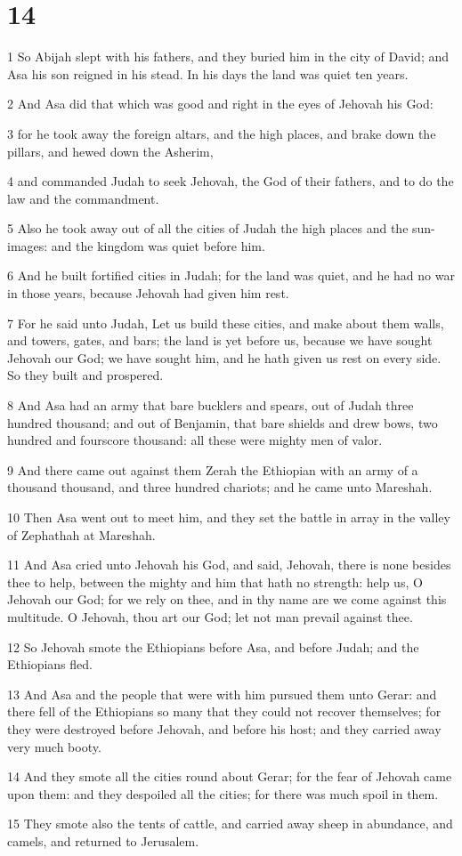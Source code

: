 \chapter{14}

\par 1 So Abijah slept with his fathers, and they buried him in the city of David; and Asa his son reigned in his stead. In his days the land was quiet ten years.
\par 2 And Asa did that which was good and right in the eyes of Jehovah his God:
\par 3 for he took away the foreign altars, and the high places, and brake down the pillars, and hewed down the Asherim,
\par 4 and commanded Judah to seek Jehovah, the God of their fathers, and to do the law and the commandment.
\par 5 Also he took away out of all the cities of Judah the high places and the sun-images: and the kingdom was quiet before him.
\par 6 And he built fortified cities in Judah; for the land was quiet, and he had no war in those years, because Jehovah had given him rest.
\par 7 For he said unto Judah, Let us build these cities, and make about them walls, and towers, gates, and bars; the land is yet before us, because we have sought Jehovah our God; we have sought him, and he hath given us rest on every side. So they built and prospered.
\par 8 And Asa had an army that bare bucklers and spears, out of Judah three hundred thousand; and out of Benjamin, that bare shields and drew bows, two hundred and fourscore thousand: all these were mighty men of valor.
\par 9 And there came out against them Zerah the Ethiopian with an army of a thousand thousand, and three hundred chariots; and he came unto Mareshah.
\par 10 Then Asa went out to meet him, and they set the battle in array in the valley of Zephathah at Mareshah.
\par 11 And Asa cried unto Jehovah his God, and said, Jehovah, there is none besides thee to help, between the mighty and him that hath no strength: help us, O Jehovah our God; for we rely on thee, and in thy name are we come against this multitude. O Jehovah, thou art our God; let not man prevail against thee.
\par 12 So Jehovah smote the Ethiopians before Asa, and before Judah; and the Ethiopians fled.
\par 13 And Asa and the people that were with him pursued them unto Gerar: and there fell of the Ethiopians so many that they could not recover themselves; for they were destroyed before Jehovah, and before his host; and they carried away very much booty.
\par 14 And they smote all the cities round about Gerar; for the fear of Jehovah came upon them: and they despoiled all the cities; for there was much spoil in them.
\par 15 They smote also the tents of cattle, and carried away sheep in abundance, and camels, and returned to Jerusalem.

